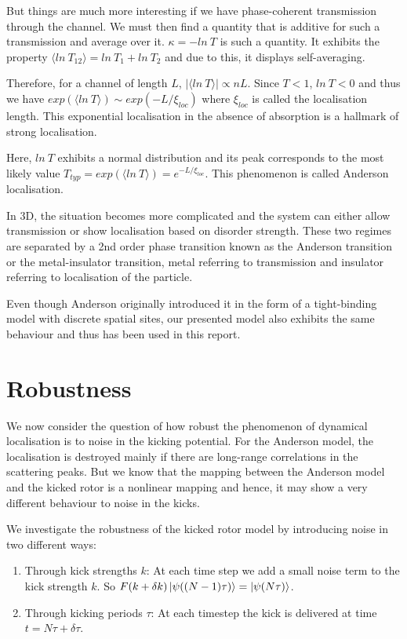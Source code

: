 \documentclass[twocolumn]{report}
\begin{document}
But things
are much more interesting if we have phase-coherent transmission through
the channel. We must then find a quantity that is additive for such a
transmission and average over it. $\kappa = - ln\ T$ is such a quantity.
It exhibits the property $\langle ln\ T_{12} \rangle = ln\ T_1 + ln\ T_2$ and
due to this, it displays self-averaging.

Therefore, for a channel of
length $L$, $|\langle ln\ T \rangle| \propto nL$. Since $T < 1$, $ln\ T < 0$
and thus we have $exp(\langle ln\ T \rangle) \sim exp(-L/\xi_{loc})$ where
$\xi_{loc}$ is called the localisation length. This exponential localisation
in the absence of absorption is a hallmark of strong localisation.

Here,
$ln\ T$ exhibits a normal distribution and its peak corresponds to the most
likely value $T_{typ} = exp(\langle ln\ T \rangle) = e^{-L/\xi_{loc}}$. This
phenomenon is called Anderson localisation.

In 3D, the situation becomes
more complicated and the system can either allow transmission or show
localisation based on disorder strength. These two regimes are separated by
a 2nd order phase transition known as the Anderson transition or the
metal-insulator transition, metal referring to transmission and insulator
referring to localisation of the particle.

Even though Anderson originally
introduced it in the form of a tight-binding model with discrete spatial
sites, our presented model also exhibits the same behaviour and thus has
been used in this report.

\section{Robustness}
We now consider the question of how robust the phenomenon of dynamical
localisation is to noise in the kicking potential. For the Anderson model,
the localisation is destroyed mainly if there are long-range correlations
in the scattering peaks. But we know that the mapping between the Anderson
model and the kicked rotor is a nonlinear mapping and hence, it may show
a very different behaviour to noise in the kicks.

We investigate the robustness of the kicked rotor model by introducing noise
in two different ways:
\begin{enumerate}
    \item Through kick strengths $k$: At each time step we add a small noise
    term to the kick strength $k$. So $F(k+\delta k)\ket{\psi((N-1)\tau)} =
    \ket{\psi(N\tau)}$.

    \item Through kicking periods $\tau$: At each timestep the kick is
    delivered at time $t = N\tau + \delta \tau$.
\end{enumerate}
\end{document}
